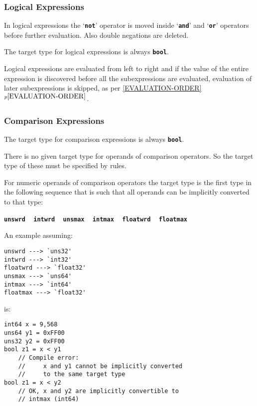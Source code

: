 \documentclass[12pt]{article}
\newcommand{\TT}[1]{{\tt \bfseries #1}}
\newcommand{\itemref}[1]{\ref{#1}$^{p\pageref{#1}}$}
\newenvironment{indpar}[1][0.3in]%
	{\begin{list}{}%
		     {\setlength{\itemsep}{0in}%
		      \setlength{\topsep}{0in}%
		      \setlength{\parsep}{1ex}%
		      \setlength{\labelwidth}{#1}%
		      \setlength{\leftmargin}{#1}%
		      \addtolength{\leftmargin}{\labelsep}}%
	 \item}%
	{\end{list}}
\begin{document}
\subsubsection{Logical Expressions}

In logical expressions the `\TT{not}' operator is moved inside
`\TT{and}' and `\TT{or}' operators before further evaluation.
Also double negations are deleted.

The target type for logical expressions is always \TT{bool}.

Logical expressions are evaluated from left to right and
if the value of the entire expression is discovered before all
the subexpressions are evaluated, evaluation of later subexpressions is
skipped, as per \itemref{EVALUATION-ORDER}.

\subsubsection{Comparison Expressions}
\label{COMPARISON-EXPRESSIONS}

The target type for comparison expressions is always \TT{bool}.

There is no given target type for operands of comparison operators.
So the target type of these must be specified by rules.

For numeric operands of comparison operators
the target type is the first type
in the following sequence that is such that all operands
can be implicitly converted to that type:
\begin{center}
\TT{unswrd} ~ \TT{intwrd} ~ \TT{unsmax} ~ \TT{intmax}
           ~ \TT{floatwrd} ~ \TT{floatmax}
\end{center}

An example assuming:


\begin{indpar}\begin{verbatim}
unswrd ---> `uns32'
intwrd ---> `int32'
floatwrd ---> `float32'
unsmax ---> `uns64'
intmax ---> `int64'
floatmax ---> `float32'
\end{verbatim}\end{indpar}

is:

\begin{indpar}\begin{verbatim}
int64 x = 9,568
uns64 y1 = 0xFF00
uns32 y2 = 0xFF00
bool z1 = x < y1
    // Compile error:
    //     x and y1 cannot be implicitly converted
    //     to the same target type
bool z1 = x < y2
    // OK, x and y2 are implicitly convertible to
    // intmax (int64)
\end{verbatim}\end{indpar}
\end{document}
